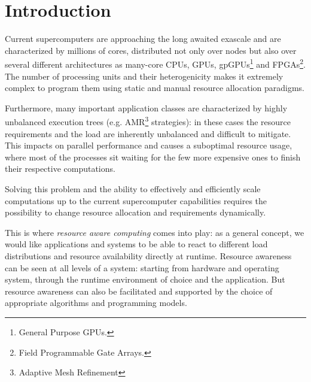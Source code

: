 
\section{Introduction}

Current supercomputers are approaching the long awaited exascale and are characterized by millions of cores, distributed not only over nodes but also over several different architectures as many-core CPUs, GPUs, gpGPUs\footnote{General Purpose GPUs.} and FPGAs\footnote{Field Programmable Gate Arrays.}.
The number of processing units and their heterogenicity makes it extremely complex to program them using static and manual resource allocation paradigms.

Furthermore, many important application classes are characterized by highly unbalanced execution trees (e.g. AMR\footnote{Adaptive Mesh Refinement} strategies): in these cases the resource requirements and the load are inherently unbalanced and difficult to mitigate.
This impacts on parallel performance and causes a suboptimal resource usage, where most of the processes sit waiting for the few more expensive ones to finish their respective computations.

Solving this problem and the ability to effectively and efficiently scale computations up to the current supercomputer capabilities requires the possibility to change resource allocation and requirements dynamically.

This is where \emph{resource aware computing} comes into play: as a general concept, we would like applications and systems to be able to react to different load distributions and resource availability directly at runtime. Resource awareness can be seen at all levels of a system: starting from hardware and operating system, through the runtime environment of choice and the application. But resource awareness can also be facilitated and supported by the choice of appropriate algorithms and programming models.

